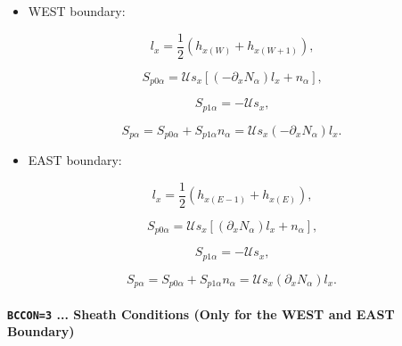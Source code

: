 \documentclass[11pt]{article}
\begin{document}
\begin{itemize}
\item  WEST boundary:
\end{itemize}

\begin{equation}
l_{x}=\frac{1}{2}\left( h_{x(W)}+h_{x(W+1)}\right) \text{,}   \label{c22}
\end{equation}

\begin{equation}
S_{p0\alpha}=\mathcal{U}s_{x}\left[ \left( -\partial_{x}N_{\alpha}\right)
l_{x}+n_{\alpha}\right] \text{,}   \label{c23}
\end{equation}

\begin{equation}
S_{p1\alpha}=-\mathcal{U}s_{x}\text{,}   \label{c24}
\end{equation}

\begin{equation}
S_{p\alpha}=S_{p0\alpha}+S_{p1\alpha}n_{\alpha}=\mathcal{U}s_{x}\left(
-\partial_{x}N_{\alpha}\right) l_{x}\text{.}   \label{c25}
\end{equation}

\begin{itemize}
\item  EAST boundary:
\end{itemize}

\begin{equation}
l_{x}=\frac{1}{2}\left( h_{x(E-1)}+h_{x(E)}\right) \text{,}   \label{c26}
\end{equation}

\begin{equation}
S_{p0\alpha}=\mathcal{U}s_{x}\left[ \left( \partial_{x}N_{\alpha}\right)
l_{x}+n_{\alpha}\right] \text{,}   \label{c27}
\end{equation}

\begin{equation}
S_{p1\alpha}=-\mathcal{U}s_{x}\text{,}   \label{c28}
\end{equation}

\begin{equation}
S_{p\alpha}=S_{p0\alpha}+S_{p1\alpha}n_{\alpha}=\mathcal{U}s_{x}\left(
\partial_{x}N_{\alpha}\right) l_{x}\text{.}   \label{c29}
\end{equation}

\bigskip

\paragraph{\texttt{BCCON=3} ... Sheath Conditions (Only for the WEST and
EAST Boundary)}
\end{document}
